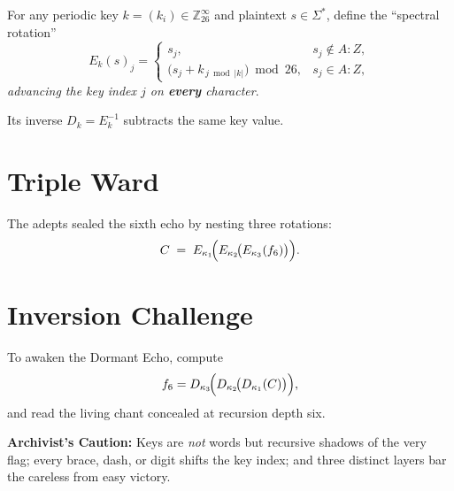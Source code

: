 \documentclass[12pt]{article}
\begin{document}
For any periodic key \(k=(k_i)\in\mathbb Z_{26}^{\infty}\) and plaintext \(s\in\Sigma^{\!*}\),
define the ``spectral rotation''
\[
E_k(s)_j =
\begin{cases}
s_j, & s_j \notin A{:}Z,\\[6pt]
\bigl(s_j + k_{\,j\bmod |k|}\bigr)\bmod 26, & s_j \in A{:}Z,
\end{cases}
\]
\emph{advancing the key index \(j\) on \textbf{every} character}.

Its inverse \(D_k = E_k^{-1}\) subtracts the same key value.

\section*{Triple Ward}

The adepts sealed the sixth echo by nesting three rotations:
\[
C \;=\; E_{\kappa_1}\!\Bigl(E_{\kappa_2}\!\bigl(E_{\kappa_3}(f_6)\bigr)\Bigr).
\]

\section*{Inversion Challenge}

To awaken the Dormant Echo, compute
\[
f_6 = D_{\kappa_3}\!\Bigl(D_{\kappa_2}\!\bigl(D_{\kappa_1}(C)\bigr)\Bigr),
\]
and read the living chant concealed at recursion depth six.

\bigskip\noindent
\textbf{Archivist's Caution:}  
Keys are \emph{not} words but recursive shadows of the very flag;  
every brace, dash, or digit shifts the key index;  
and three distinct layers bar the careless from easy victory.
\end{document}
